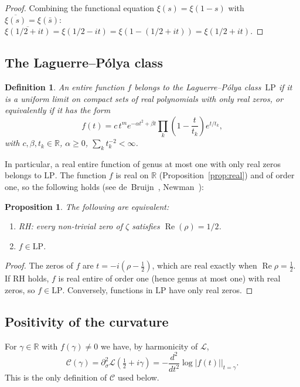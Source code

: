 \documentclass[11pt]{amsart}
\newtheorem{proposition}[theorem]{Proposition}
\newtheorem{definition}[theorem]{Definition}
\renewcommand{\Re}{\operatorname{Re}}
\newcommand{\LP}{\mathrm{LP}}
\begin{document}
\begin{proof}
Combining the functional equation $\xi(s) = \xi(1-s)$ with
$\overline{\xi(s)} = \xi(\bar{s})$:
$\overline{\xi(1/2+it)} = \xi(1/2-it) = \xi(1-(1/2+it)) = \xi(1/2+it)$.
\end{proof}

\subsection{The Laguerre--P\'olya class}

\begin{definition}
An entire function $f$ belongs to the \emph{Laguerre--P\'olya class}~$\LP$ if it is a
uniform limit on compact sets of real polynomials with only real zeros, or equivalently if
it has the form
\[
  f(t) = c\,t^m e^{-\alpha t^2+\beta t}\prod_k\!\left(1-\frac{t}{t_k}\right)e^{t/t_k},
\]
with $c,\beta,t_k \in \mathbb{R}$, $\alpha \geq 0$, $\sum_k t_k^{-2} < \infty$.
\end{definition}

In particular,
a real entire function of genus at most one with only real zeros belongs to $\LP$. The
function $f$ is real on $\mathbb R$ (Proposition~\ref{prop:real}) and of order one, so the
following holds (see de~Bruijn~\cite{deBruijn1950}, Newman~\cite{Newman1976}):

\begin{proposition}\label{prop:rh-lp}
The following are equivalent:
\begin{enumerate}
  \item[\rm(1)] RH: every non-trivial zero of $\zeta$ satisfies $\Re(\rho) = 1/2$.
  \item[\rm(2)] $f \in\LP$.
\end{enumerate}
\end{proposition}

\begin{proof}
The zeros of $f$ are $t=-i(\rho-\tfrac12)$, which are real exactly when $\Re\rho=\tfrac12$.
If RH holds, $f$ is real entire of order one (hence genus at most one) with real zeros, so
$f\in\LP$. Conversely, functions in $\LP$ have only real zeros.
\end{proof}

\subsection{Positivity of the curvature}

For $\gamma\in\mathbb R$ with $f(\gamma)\neq0$ we have, by harmonicity of $\mathcal L$,
\[
  \mathcal{C}(\gamma) = \partial^2_{\sigma}\mathcal{L}(\tfrac12+i\gamma)
  = -\frac{d^2}{dt^2}\log|f(t)|\Big|_{t=\gamma}.
\]
This is the only definition of $\mathcal C$ used below.
\end{document}
